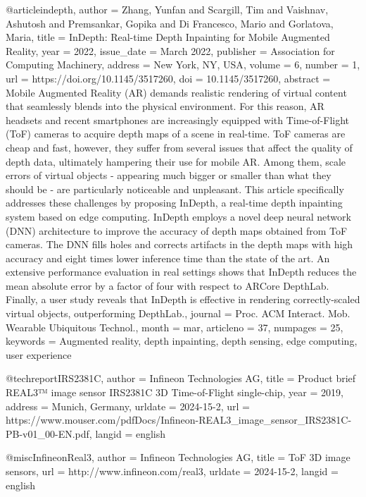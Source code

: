 @article{indepth,
author = {Zhang, Yunfan and Scargill, Tim and Vaishnav, Ashutosh and Premsankar, Gopika and Di Francesco, Mario and Gorlatova, Maria},
title = {InDepth: Real-time Depth Inpainting for Mobile Augmented Reality},
year = {2022},
issue_date = {March 2022},
publisher = {Association for Computing Machinery},
address = {New York, NY, USA},
volume = {6},
number = {1},
url = {https://doi.org/10.1145/3517260},
doi = {10.1145/3517260},
abstract = {Mobile Augmented Reality (AR) demands realistic rendering of virtual content that seamlessly blends into the physical environment. For this reason, AR headsets and recent smartphones are increasingly equipped with Time-of-Flight (ToF) cameras to acquire depth maps of a scene in real-time. ToF cameras are cheap and fast, however, they suffer from several issues that affect the quality of depth data, ultimately hampering their use for mobile AR. Among them, scale errors of virtual objects - appearing much bigger or smaller than what they should be - are particularly noticeable and unpleasant. This article specifically addresses these challenges by proposing InDepth, a real-time depth inpainting system based on edge computing. InDepth employs a novel deep neural network (DNN) architecture to improve the accuracy of depth maps obtained from ToF cameras. The DNN fills holes and corrects artifacts in the depth maps with high accuracy and eight times lower inference time than the state of the art. An extensive performance evaluation in real settings shows that InDepth reduces the mean absolute error by a factor of four with respect to ARCore DepthLab. Finally, a user study reveals that InDepth is effective in rendering correctly-scaled virtual objects, outperforming DepthLab.},
journal = {Proc. ACM Interact. Mob. Wearable Ubiquitous Technol.},
month = {mar},
articleno = {37},
numpages = {25},
keywords = {Augmented reality, depth inpainting, depth sensing, edge computing, user experience}
}


@techreport{IRS2381C,
    author = {Infineon Technologies AG},
    title = {Product brief REAL3™ image sensor IRS2381C 3D Time-of-Flight single-chip},
    year = {2019},
    address = {Munich, Germany},
    urldate   = {2024-15-2},
    url = {https://www.mouser.com/pdfDocs/Infineon-REAL3_image_sensor_IRS2381C-PB-v01_00-EN.pdf},
    langid  = {english}
}

@misc{InfineonReal3,
    author = {Infineon Technologies AG},
    title = {ToF 3D image sensors},
    url = {http://www.infineon.com/real3},
    urldate   = {2024-15-2},
    langid  = {english}
}

